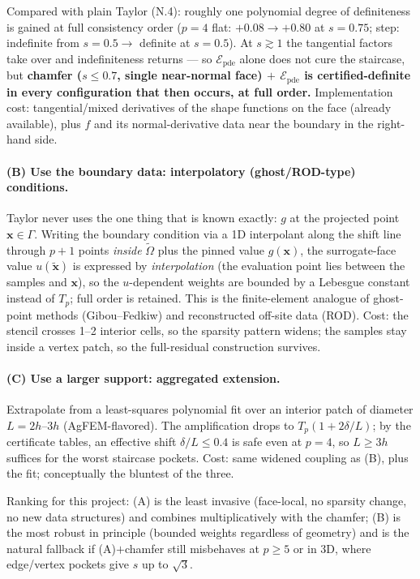 Compared with plain Taylor (N.4): roughly one polynomial degree of
definiteness is gained at full consistency order ($p=4$ flat: $+0.08 \to
+0.80$ at $s = 0.75$; step: indefinite from $s=0.5 \to$ definite at
$s=0.5$). At $s \gtrsim 1$ the tangential factors take over and
indefiniteness returns --- so $\mathcal E_{\mathrm{pde}}$ alone does not
cure the staircase, but \textbf{chamfer ($s \le 0.7$, single near-normal
face) $+$ $\mathcal E_{\mathrm{pde}}$ is certified-definite in every
configuration that then occurs, at full order.} Implementation cost:
tangential/mixed derivatives of the shape functions on the face (already
available), plus $f$ and its normal-derivative data near the boundary in
the right-hand side.

\paragraph{(B) Use the boundary data: interpolatory (ghost/ROD-type)
conditions.} Taylor never uses the one thing that is known exactly: $g$ at
the projected point $\mathbf x \in \Gamma$. Writing the boundary condition
via a 1D interpolant along the shift line through $p{+}1$ points
\emph{inside} $\tilde\Omega$ plus the pinned value $g(\mathbf x)$, the
surrogate-face value $u(\tilde{\mathbf x})$ is expressed by
\emph{interpolation} (the evaluation point lies between the samples and
$\mathbf x$), so the $u$-dependent weights are bounded by a Lebesgue
constant instead of $T_p$; full order is retained. This is the
finite-element analogue of ghost-point methods (Gibou--Fedkiw) and
reconstructed off-site data (ROD). Cost: the stencil crosses 1--2 interior
cells, so the sparsity pattern widens; the samples stay inside a vertex
patch, so the full-residual construction survives.

\paragraph{(C) Use a larger support: aggregated extension.} Extrapolate
from a least-squares polynomial fit over an interior patch of diameter
$L = 2h$--$3h$ (AgFEM-flavored). The amplification drops to
$T_p(1 + 2\delta/L)$; by the certificate tables, an effective shift
$\delta/L \le 0.4$ is safe even at $p=4$, so $L \ge 3h$ suffices for the
worst staircase pockets. Cost: same widened coupling as (B), plus the fit;
conceptually the bluntest of the three.

Ranking for this project: (A) is the least invasive (face-local, no
sparsity change, no new data structures) and combines multiplicatively
with the chamfer; (B) is the most robust in principle (bounded weights
regardless of geometry) and is the natural fallback if (A)$+$chamfer still
misbehaves at $p \ge 5$ or in 3D, where edge/vertex pockets give $s$ up to
$\sqrt3$.

